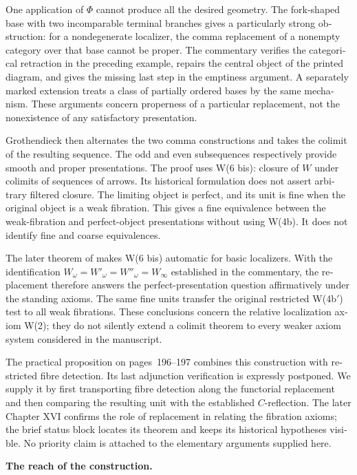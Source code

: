 \begin{otherlanguage}{english}
One application of $\Phi$ cannot produce all the desired geometry. The fork-shaped base with two incomparable terminal branches gives a particularly strong obstruction: for a nondegenerate localizer, the comma replacement of a nonempty category over that base cannot be proper. The commentary verifies the categorical retraction in the preceding example, repairs the central object of the printed diagram, and gives the missing last step in the emptiness argument. A separately marked extension treats a class of partially ordered bases by the same mechanism. These arguments concern properness of a particular replacement, not the nonexistence of any satisfactory presentation.

Grothendieck then alternates the two comma constructions and takes the colimit of the resulting sequence. The odd and even subsequences respectively provide smooth and proper presentations. The proof uses W(6 bis): closure of $W$ under colimits of sequences of arrows. Its historical formulation does not assert arbitrary filtered closure. The limiting object is perfect, and its unit is fine when the original object is a weak fibration. This gives a fine equivalence between the weak-fibration and perfect-object presentations without using W(4b). It does not identify fine and coarse equivalences.

The later theorem of \citet[Corollary~4.2.22]{Cisinski2006} makes W(6 bis) automatic for basic localizers. With the identification $W_\omega=W'_\omega=W''_\omega=W_\infty$ established in the commentary, the replacement therefore answers the perfect-presentation question affirmatively under the standing axioms. The same fine units transfer the original restricted W(4b$'$) test to all weak fibrations. These conclusions concern the relative localization axiom W(2); they do not silently extend a colimit theorem to every weaker axiom system considered in the manuscript.

The practical proposition on pages~196--197 combines this construction with restricted fibre detection. Its last adjunction verification is expressly postponed. We supply it by first transporting fibre detection along the functorial replacement and then comparing the resulting unit with the established $C$-reflection. The later Chapter XVI confirms the role of replacement in relating the fibration axioms; the brief status block locates its theorem and keeps its historical hypotheses visible. No priority claim is attached to the elementary arguments supplied here.

\medskip\noindent\textbf{The reach of the construction.}


\end{otherlanguage}
